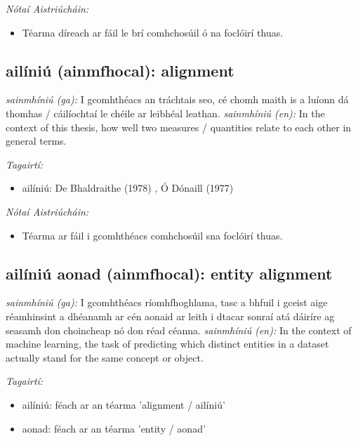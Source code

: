 \documentclass{article}
\begin{document}
 \noindent \textit{Nótaí Aistriúcháin:}
\begin{itemize}
	\item Téarma díreach ar fáil le brí comhchosúil ó na foclóirí thuas.
\end{itemize}


\subsection*{ailíniú (ainmfhocal): alignment} 
 \noindent \textit{sainmhíniú (ga):} I gcomhthéacs an tráchtais seo, cé chomh maith is a luíonn dá thomhas / cáilíochtaí le chéile ar leibhéal leathan.
\newline\newline
 \noindent \textit{sainmhíniú (en):} In the context of this thesis, how well two measures / quantities relate to each other in general terms.
\newline

 \noindent \textit{Tagairtí:}
\begin{itemize}
	\item ailíniú: De Bhaldraithe (1978) \cite{de-bhaldraithe}, Ó Dónaill (1977) \cite{odonaill}
\end{itemize}

 \noindent \textit{Nótaí Aistriúcháin:}
\begin{itemize}
	\item Téarma ar fáil i gcomhthéacs comhchosúil sna foclóirí thuas.
\end{itemize}


\subsection*{ailíniú aonad (ainmfhocal): entity alignment} 
 \noindent \textit{sainmhíniú (ga):} I gcomhthéacs ríomhfhoghlama, tasc a bhfuil i gceist aige réamhinsint a dhéanamh ar cén aonaid ar leith i dtacar sonraí atá dáiríre ag seasamh don choincheap nó don réad céanna.
\newline\newline
 \noindent \textit{sainmhíniú (en):} In the context of machine learning, the task of predicting which distinct entities in a dataset actually stand for the same concept or object.
\newline

 \noindent \textit{Tagairtí:}
\begin{itemize}
	\item ailíniú: féach ar an téarma 'alignment / ailíniú'
	\item aonad: féach ar an téarma 'entity / aonad'
\end{itemize}
\end{document}
